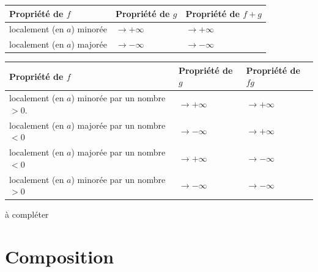 \begin{center}
\renewcommand{\arraystretch}{1.3}
\begin{tabular}{l|l|l}
Propriété de $f$ & Propriété de $g$ & Propriété de $f + g$\\ \hline
localement (en $a$) minorée & $\rightarrow+\infty$ & $\rightarrow+\infty$ \\ \hline
localement (en $a$) majorée & $\rightarrow-\infty$ & $\rightarrow-\infty$
\end{tabular}
\end{center}
\begin{center}
\renewcommand{\arraystretch}{1.3}
\begin{tabular}{l|l|l}
Propriété de $f$ & Propriété de $g$ & Propriété de $fg$\\ \hline
localement (en $a$) minorée par un nombre $>0$. & $\rightarrow+\infty$ & $\rightarrow+\infty$ \\ \hline
localement (en $a$) majorée par un nombre $<0$ & $\rightarrow-\infty$ & $\rightarrow +\infty$\\ \hline
localement (en $a$) majorée par un nombre $<0$ & $\rightarrow+\infty$ & $\rightarrow -\infty$\\ \hline
localement (en $a$) minorée par un nombre $>0$ & $\rightarrow-\infty$ & $\rightarrow -\infty$\\ \hline
\end{tabular}
\end{center}
\begin{demo}
  à compléter
\end{demo}


\section{Composition}
